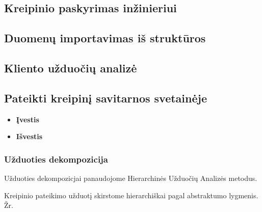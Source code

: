 	\subsection {Kreipinio paskyrimas inžinieriui}

	\subsection {Duomenų importavimas iš struktūros}
	
\subsection {Kliento užduočių analizė}

	\subsection {Pateikti kreipinį savitarnos svetainėje}
		
		\begin{itemize}
			\item \textbf{Įvestis}
			\item \textbf{Išvestis} 
		\end{itemize}

	\subsubsection {Užduoties dekompozicija}

	Užduoties dekompozicjai panaudojome Hierarchinės Užduočių Analizės metodus.
 		

	Kreipinio pateikimo užduotį skirstome hierarchiškai pagal abstraktumo lygmenis. Žr. 

